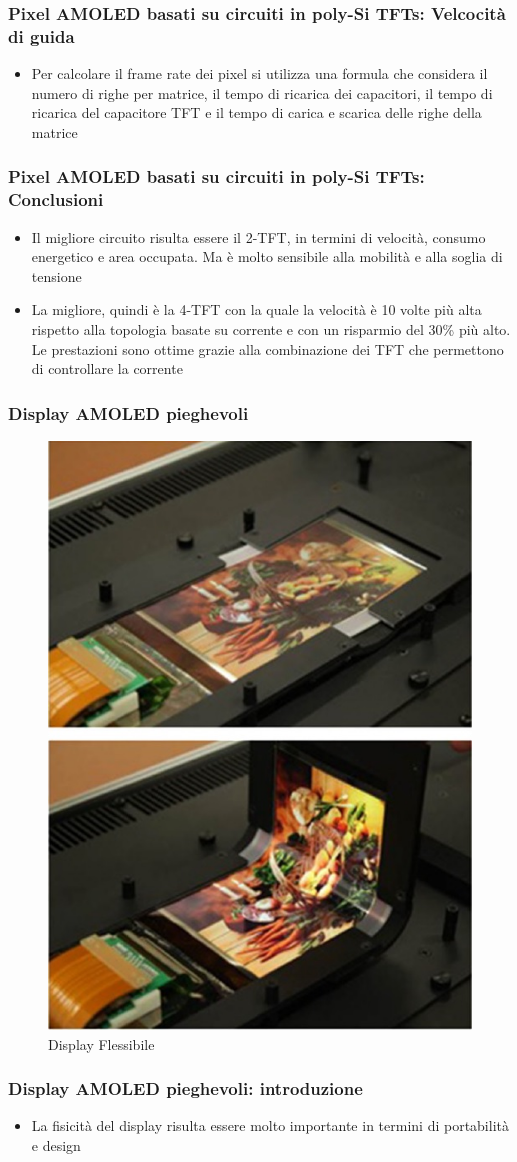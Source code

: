 \documentclass[12pt]{beamer}
\begin{document}
	\begin{frame}
		\frametitle{Pixel AMOLED basati su circuiti in poly-Si TFTs: Velcocità di guida}
		\begin{itemize}
			\item Per calcolare il frame rate dei pixel	si utilizza una formula che considera il numero di righe per matrice, il tempo di ricarica dei capacitori, il tempo di ricarica del capacitore TFT e il tempo di carica e scarica delle righe della matrice
		\end{itemize}
	\end{frame}
	\begin{frame}
		\frametitle{Pixel AMOLED basati su circuiti in poly-Si TFTs: Conclusioni}
		\begin{itemize}
			\item Il migliore circuito risulta essere il 2-TFT, in termini di velocità, consumo energetico e area occupata. Ma è molto sensibile alla mobilità e alla soglia di tensione
			\pause
			\item La migliore, quindi è la 4-TFT con la quale la velocità è 10 volte più alta rispetto alla
			topologia basate su corrente e con un risparmio del 30\% più alto. Le prestazioni sono ottime grazie alla combinazione dei TFT che permettono di controllare la corrente
		\end{itemize}
	\end{frame}
	\begin{frame}
		\frametitle{Display AMOLED pieghevoli}
		\begin{figure}
			\centering
			\includegraphics[width=0.4\linewidth]{FISICA/flex1}
			\caption{Display Flessibile}
			\label{fig:flex1}
		\end{figure}
	\end{frame}
	\begin{frame}
		\frametitle{Display AMOLED pieghevoli: introduzione}
		\begin{itemize}
			\item La fisicità del display risulta essere molto importante in termini di portabilità e design
		\end{itemize}
	\end{frame}
\end{document}
